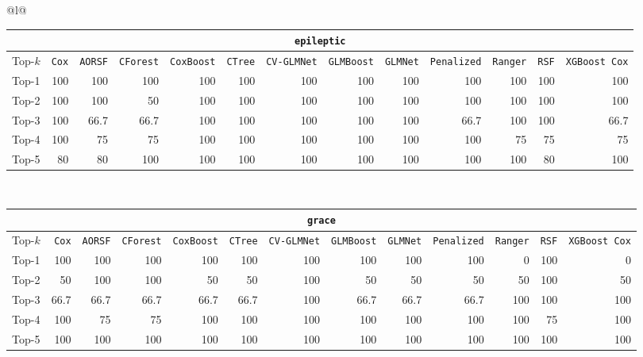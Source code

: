 \begin{longtable}{@{}l@{}}
\begin{tabular}{@{}l*{12}{r}@{}}
\multicolumn{13}{c}{\texttt{epileptic}} \\
\midrule
Top-$k$ & \texttt{Cox} & \texttt{AORSF} & \texttt{CForest} & \texttt{CoxBoost} & \texttt{CTree} & \texttt{CV-GLMNet} & \texttt{GLMBoost} & \texttt{GLMNet} & \texttt{Penalized} & \texttt{Ranger} & \texttt{RSF} & \texttt{XGBoost Cox} \\
\midrule
Top-1 & 100 & 100 & 100 & 100 & 100 & 100 & 100 & 100 & 100 & 100 & 100 & 100 \\
Top-2 & 100 & 100 & 50 & 100 & 100 & 100 & 100 & 100 & 100 & 100 & 100 & 100 \\
Top-3 & 100 & 66.7 & 66.7 & 100 & 100 & 100 & 100 & 100 & 66.7 & 100 & 100 & 66.7 \\
Top-4 & 100 & 75 & 75 & 100 & 100 & 100 & 100 & 100 & 100 & 75 & 75 & 75 \\
Top-5 & 80 & 80 & 100 & 100 & 100 & 100 & 100 & 100 & 100 & 100 & 80 & 100 \\
\end{tabular} \\
\midrule

\begin{tabular}{@{}l*{12}{r}@{}}
\multicolumn{13}{c}{\texttt{grace}} \\
\midrule
Top-$k$ & \texttt{Cox} & \texttt{AORSF} & \texttt{CForest} & \texttt{CoxBoost} & \texttt{CTree} & \texttt{CV-GLMNet} & \texttt{GLMBoost} & \texttt{GLMNet} & \texttt{Penalized} & \texttt{Ranger} & \texttt{RSF} & \texttt{XGBoost Cox} \\
\midrule
Top-1 & 100 & 100 & 100 & 100 & 100 & 100 & 100 & 100 & 100 & 0 & 100 & 0 \\
Top-2 & 50 & 100 & 100 & 50 & 50 & 100 & 50 & 50 & 50 & 50 & 100 & 50 \\
Top-3 & 66.7 & 66.7 & 66.7 & 66.7 & 66.7 & 100 & 66.7 & 66.7 & 66.7 & 100 & 100 & 100 \\
Top-4 & 100 & 75 & 75 & 100 & 100 & 100 & 100 & 100 & 100 & 100 & 75 & 100 \\
Top-5 & 100 & 100 & 100 & 100 & 100 & 100 & 100 & 100 & 100 & 100 & 100 & 100 \\
\end{tabular} \\
\midrule


\end{longtable}
